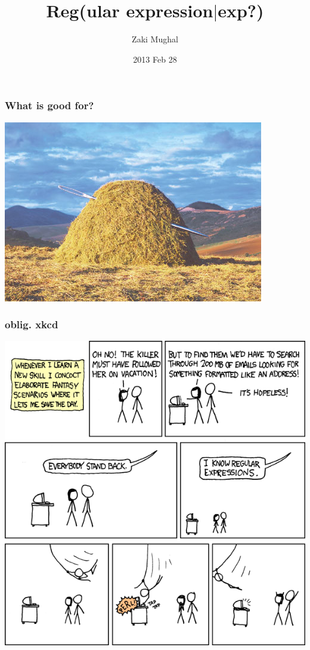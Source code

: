 \documentclass[%
        hyperref={%
                pdfauthor={Zakariyya Mughal},%
                pdfpagemode={None},pdfpagelayout={SinglePage}}%
        xcolor={x11names},%
]{beamer}
\title[Regex]{Reg(ular expression\(|\)exp?)}
\author{Zaki Mughal}
\institute{University of Houston:\\CougarCS}
\date{2013 Feb 28}
\begin{document}
\frame{\titlepage}

\begin{frame}
\frametitle{What is good for?}
\includegraphics[width=\textwidth]{gfx/finding-a-needle-in-a-haystack.jpg}
\end{frame}

\begin{frame}
\frametitle{oblig. xkcd}
\includegraphics[height=0.90\textheight]{gfx/regular_expressions.png}
\end{frame}
\end{document}
